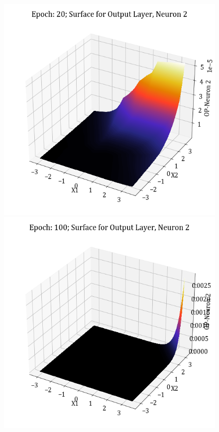 \documentclass[11pt,a4paper]{article}
\begin{document}
\begin{figure}[H]
    \includegraphics[scale=0.4]{images/1B_MLFFNN_E20_OP_N2.png}
    \includegraphics[scale=0.4]{images/1B_MLFFNN_E100_OP_N2.png}

\end{figure}
\end{document}
